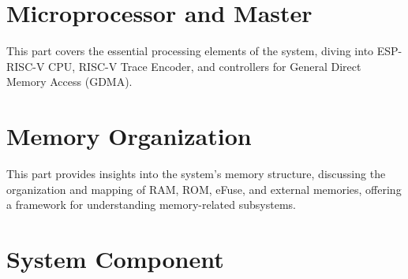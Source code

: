 \documentclass[openany, 10pt]{book}
\begin{document}
\setenglishformatting




\clearpage

\clearpage


\setcounter{table}{0}

\tableofcontents
\clearpage
\listoftables
\clearpage
\listoffigures






\part{Microprocessor and Master}


This part covers the essential processing elements of the system, diving into ESP-RISC-V CPU, RISC-V Trace Encoder, and controllers for General Direct Memory Access (GDMA).


\part{Memory Organization}

This part provides insights into the system's memory structure, discussing the organization and mapping of RAM, ROM, eFuse, and external memories, offering a framework for understanding memory-related subsystems.



\part{System Component}
\end{document}
